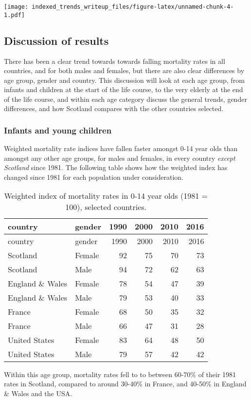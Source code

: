 \documentclass[]{article}
\begin{document}
\texttt{[image: indexed\_trends\_writeup\_files/figure-latex/unnamed-chunk-4-1.pdf]}

\subsection{Discussion of results}\label{discussion-of-results}

There has been a clear trend towards towards falling mortality rates in
all countries, and for both males and females, but there are also clear
differences by age group, gender and country. This discussion will look
at each age group, from infants and children at the start of the life
course, to the very elderly at the end of the life course, and within
each age category discuss the general trends, gender differences, and
how Scotland compares with the other countries selected.

\subsubsection{Infants and young
children}\label{infants-and-young-children}

Weighted mortality rate indices have fallen faster amongst 0-14 year
olds than amongst any other age groups, for males and females, in every
country \emph{except Scotland} since 1981. The following table shows how
the weighted index has changed since 1981 for each population under
consideration.

\begin{longtable}[]{@{}llrrrr@{}}
\caption{Weighted index of mortality rates in 0-14 year olds (1981 =
100), selected countries.}\tabularnewline
\toprule
country & gender & 1990 & 2000 & 2010 & 2016\tabularnewline
\midrule
\endfirsthead
\toprule
country & gender & 1990 & 2000 & 2010 & 2016\tabularnewline
\midrule
\endhead
Scotland & Female & 92 & 75 & 70 & 73\tabularnewline
Scotland & Male & 94 & 72 & 62 & 63\tabularnewline
England \& Wales & Female & 78 & 54 & 47 & 39\tabularnewline
England \& Wales & Male & 79 & 53 & 40 & 33\tabularnewline
France & Female & 68 & 50 & 35 & 32\tabularnewline
France & Male & 66 & 47 & 31 & 28\tabularnewline
United States & Female & 83 & 64 & 48 & 50\tabularnewline
United States & Male & 79 & 57 & 42 & 42\tabularnewline
\bottomrule
\end{longtable}

Within this age group, mortality rates fell to to between 60-70\% of
their 1981 rates in Scotland, compared to around 30-40\% in France, and
40-50\% in England \& Wales and the USA.
\end{document}
